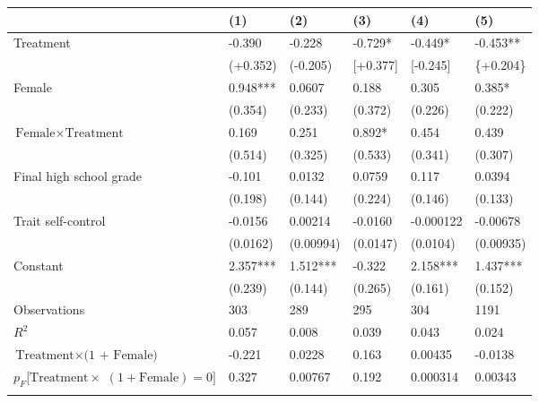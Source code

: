 \footnotesize
\newcolumntype{U}{S[table-format=+1.3, round-mode=places, round-precision=3, table-space-text-pre={**}, table-space-text-post={-**}, round-integer-to-decimal=false]}
\begin{tabularx}
	{\textwidth}
	{@{} L @{\hspace{1.5em}} U @{\hspace{1em}} U @{\hspace{1em}} U @{\hspace{1em}} U @{\hspace{1em}} U @{}}
\toprule
&	{(1)}	&	{(2)}	&	{(3)}	&	{(4)}	&	{(5)} \\
\midrule
Treatment
	&	-0.390	&	-0.228	&	-0.729*	&	-0.449*	&	-0.453**	\\
	&	(+0.352)	&	(-0.205)	&	[+0.377]	&	[-0.245]	&	{\{}+0.204{\}}	\\
Female
	&	0.948***	&	0.0607	&	0.188	&	0.305	&	0.385*	\\
	&	(0.354)	&	(0.233)	&	(0.372)	&	(0.226)	&	(0.222)	\\
$\text{Female} \times \text{Treatment}$
	&	0.169	&	0.251	&	0.892*	&	0.454	&	0.439	\\
	&	(0.514)	&	(0.325)	&	(0.533)	&	(0.341)	&	(0.307)	\\
Final high school grade
	&	-0.101	&	0.0132	&	0.0759	&	0.117	&	0.0394	\\
	&	(0.198)	&	(0.144)	&	(0.224)	&	(0.146)	&	(0.133)	\\
Trait self-control
	&	-0.0156	&	0.00214	&	-0.0160	&	-0.000122	&	-0.00678	\\
	&	(0.0162)	&	(0.00994)	&	(0.0147)	&	(0.0104)	&	(0.00935)	\\
Constant
	&	2.357***	&	1.512***	&	-0.322	&	2.158***	&	1.437***	\\
	&	(0.239)	&	(0.144)	&	(0.265)	&	(0.161)	&	(0.152)	\\
\midrule
Observations
	&	{303}	&	{289}	&	{295}	&	{304}	&	{1191}	\\
$R^2$
	&	0.057	&	0.008	&	0.039	&	0.043	&	0.024	\\
\midrule
$\text{Treatment} \times \text{(1 + Female)}$
	&	-0.221	&	0.0228	&	0.163	&	0.00435	&	-0.0138	\\
$p_F[\text{Treatment} \times {}$ \newline\hspace{12pt}$(1 + \text{Female}) = 0]$
	&	0.327	&	0.00767	&	0.192	&	0.000314	&	0.00343	\\
\bottomrule
\addlinespace
{}
\end{tabularx}